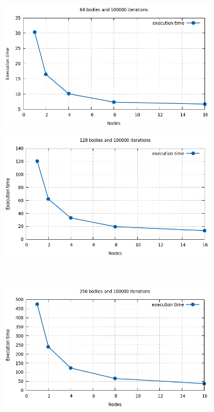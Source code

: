 \documentclass[a4paper]{article}
\begin{document}
\begin{figure}[ht]
\begin{subfigure}{.5\textwidth}
  \centering
  \includegraphics[width=1\linewidth]{results/64_100000}
\end{subfigure} %
\begin{subfigure}{.5\textwidth}
  \centering
  \includegraphics[width=1\linewidth]{results/128_100000}
\end{subfigure} \\ %
\begin{subfigure}{.5\textwidth}
  \centering
  \includegraphics[width=1\linewidth]{results/256_100000}

\end{subfigure}
\end{figure}
\end{document}
